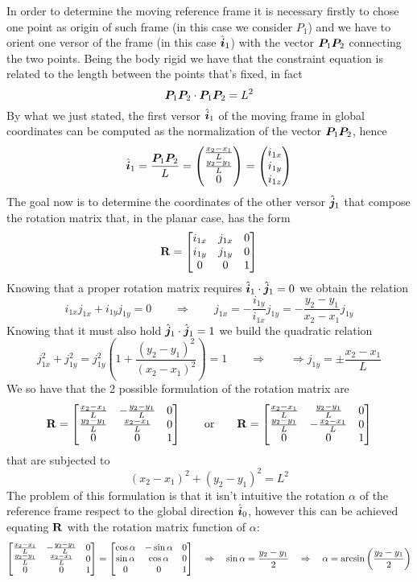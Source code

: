 		In order to determine the moving reference frame it is necessary firstly to chose one point as origin of such frame (in this case we consider $P_1$) and we have to orient one versor of the frame (in this case $\hat{\boldsymbol{i}}_1$) with the vector $\boldsymbol{P}_1 \boldsymbol{P}_2$ connecting the two points. Being the body rigid we have that the constraint equation is related to the length between the points that's fixed, in fact
		\[ \boldsymbol{P}_1\boldsymbol{P}_2 \cdot \boldsymbol{P}_1\boldsymbol{P}_2 = L^2 \]
		By what we just stated, the first versor $\hat{\boldsymbol{i}}_1$ of the moving frame in global coordinates can be computed as the normalization of the vector $\boldsymbol{P}_1\boldsymbol{P}_2$, hence
		\[ \hat{\boldsymbol{i}}_1 = \frac{\boldsymbol{P}_1 \boldsymbol{P}_2}{L} = \begin{pmatrix}  \frac{x_2- x_1}{L} \\ \frac{y_2 - y_1}{L} \\ 0 \end{pmatrix} = \begin{pmatrix} i_{1x} \\ i_{1y} \\ i_{1z}  \end{pmatrix} \]
		The goal now is to determine the coordinates of the other versor $\hat{\boldsymbol{j}}_1$ that compose the rotation matrix that, in the planar case, has the form
		\[ \mathbf{R} = \begin{bmatrix} i_{1x} & j_{1x} & 0 \\ i_{1y} & j_{1y} & 0 \\ 0 & 0 & 1  \end{bmatrix}  \]
		Knowing that a proper rotation matrix requires $\hat{\boldsymbol{i}}_1 \cdot \hat{\boldsymbol{j}}_1 = 0$ we obtain the relation
		\[ i_{1x}j_{1x} + i_{1y} j_{1y} = 0 \qquad \Rightarrow \qquad j_{1x} = - \frac{i_{1y}}{i_{1x}} j_{1y} = - \frac{y_2 - y_1}{x_2-x_1} j_{1y} \]
		Knowing that it must also hold $\hat{\boldsymbol{j}}_1 \cdot \hat{\boldsymbol{j}}_1 = 1$ we build the quadratic relation
		\[ j_{1x}^2 + j_{1y}^2 = j_{1y}^2\left( 1 + \frac{(y_2-y_1)^2}{ (x_2 - x_1)^2 } \right) = 1 \qquad \Rightarrow \qquad \Rightarrow j_{1y} = \pm \frac{x_2-x_1}{L} \]
		We so have that the 2 possible formulation of the rotation matrix are
		\[ \mathbf{R} = \begin{bmatrix}  \frac{x_2 - x_1}{L} & -\frac{y_2 - y_1}{L} & 0 \\ \frac{y_2 - y_1}{L} & \frac{x_2 - x_1}{L} & 0 \\ 0 & 0 & 1  \end{bmatrix} \qquad \textrm{or} \qquad \mathbf{R} = \begin{bmatrix}  \frac{x_2 - x_1}{L} & \frac{y_2 - y_1}{L} & 0 \\ \frac{y_2 - y_1}{L} & - \frac{x_2 - x_1}{L} & 0 \\ 0 & 0 & 1  \end{bmatrix}  \]
		that are subjected to
		\[ (x_2-x_1)^2 + (y_2 - y_1)^2 = L^2 \]
		The problem of this formulation is that it isn't intuitive the rotation $\alpha$ of the reference frame respect to the global direction $\hat{\boldsymbol{i}}_0$, however this can be achieved equating $\mathbf{R}$ with the rotation matrix function of $\alpha$:
		\[ \begin{bmatrix}  \frac{x_2 - x_1}{L} & -\frac{y_2 - y_1}{L} & 0 \\ \frac{y_2 - y_1}{L} & \frac{x_2 - x_1}{L} & 0 \\ 0 & 0 & 1  \end{bmatrix} = \begin{bmatrix}  \cos\alpha & - \sin \alpha & 0 \\ \sin\alpha & \cos \alpha & 0 \\ 0 & 0 & 1 \end{bmatrix} \quad \Rightarrow \quad \sin\alpha = \frac{y_2 - y_1}{2} \quad \Rightarrow \quad \alpha = \arcsin \left( \frac{y_2 - y_1}{2} \right)  \]
		
